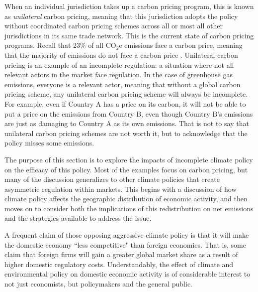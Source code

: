 When an individual jurisdiction takes up a carbon pricing program, this is known as \emph{unilateral} carbon pricing, meaning that this jurisdiction adopts the policy without coordinated carbon pricing schemes across all or most all other jurisdictions in its same trade network. This is the current state of carbon pricing programs. Recall that 23\% of all CO$_2$e emissions face a carbon price, meaning that the majority of emissions do not face a carbon price \citep{wbank}. Unilateral carbon pricing is an example of an incomplete regulation: a situation where not all relevant actors in the market face regulation. In the case of greenhouse gas emissions, everyone is a relevant actor, meaning that without a global carbon pricing scheme, any unilateral carbon pricing scheme will always be incomplete. For example, even if Country A has a price on its carbon, it will not be able to put a price on the emissions from Country B, even though Country B's emissions are just as damaging to Country A as its own emissions. That is not to say that unilateral carbon pricing schemes are not worth it, but to acknowledge that the policy misses some emissions. 

The purpose of this section is to explore the impacts of incomplete climate policy on the efficacy of this policy. Most of the examples focus on carbon pricing, but many of the discussion generalizes to other climate policies that create asymmetric regulation within markets. This begins with a discussion of how climate policy affects the geographic distribution of economic activity, and then moves on to consider both the implications of this redistribution on net emissions and the strategies available to address the issue.


A frequent claim of those opposing aggressive climate policy is that it will make the domestic economy ``less competitive" than foreign economies. That is, some claim that foreign firms will gain a greater global market share as a result of higher domestic regulatory costs. Understandably, the effect of climate and environmental policy on domestic economic activity is of considerable interest to not just economists, but policymakers and the general public.

